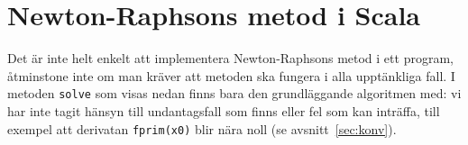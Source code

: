 \documentclass[a4paper]{article}
\begin{document}
\section{Newton-Raphsons metod i Scala}

Det är inte helt enkelt att implementera Newton-Raphsons metod i ett
program, åtminstone inte om man kräver att metoden ska fungera i
alla upptänkliga fall.  I metoden \texttt{solve} som visas nedan finns bara
den grundläggande algoritmen med: vi har inte tagit hänsyn till
undantagsfall som finns eller fel som kan inträffa, till exempel
att derivatan \texttt{fprim(x0)} blir nära noll (se avsnitt~\ref{sec:konv}).

\end{document}
